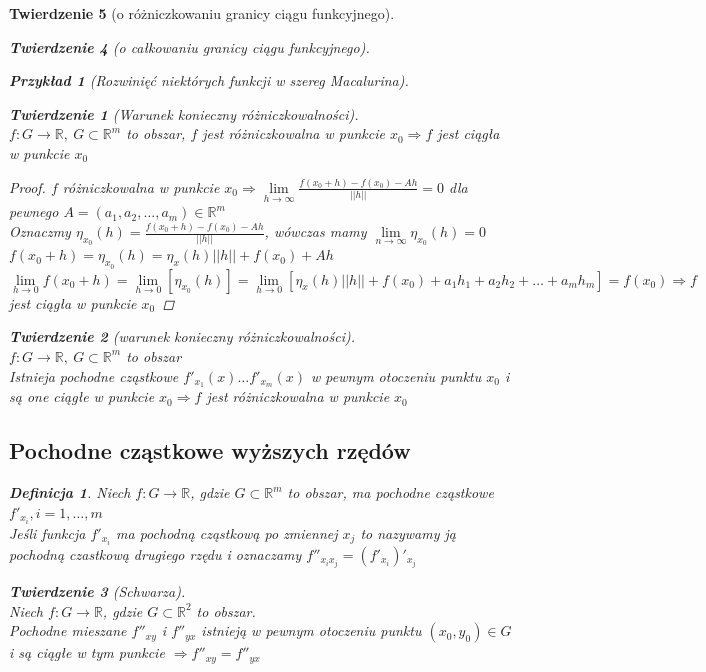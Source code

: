 \documentclass[12pt,a4paper]{article}
\newtheorem{tw}{Twierdzenie}
\newtheorem{przyklad}{Przykład}
\theoremstyle{definition}
\newtheorem{df}{Definicja}
\begin{document}
\begin{tw}[o różniczkowaniu granicy ciągu funkcyjnego]
\begin{tw}[o całkowaniu granicy ciągu funkcyjnego]
\begin{przyklad}[Rozwinięć niektórych funkcji w szereg Macalurina]

\begin{tw}[Warunek konieczny różniczkowalności]~\\
$f:G\to\mathbb{R}, ~ G\subset\mathbb{R}^m$ to obszar, $f$ jest różniczkowalna w punkcie $x_0 \Rightarrow f$ jest ciągła w punkcie $x_0$
\begin{proof}
$f$ różniczkowalna w punkcie $x_0 \Rightarrow \lim\limits_{h\to\infty}\frac{f(x_0+h)-f(x_0)-Ah}{||h||}=0$ dla pewnego $A=(a_1,a_2, \dots, a_m) \in \mathbb{R}^m$\\
Oznaczmy $\eta_{x_0}(h) = \frac{f(x_0+h)-f(x_0)-Ah}{||h||}$, wówczas mamy $\lim\limits_{n\to\infty}\eta_{x_0}(h) = 0$\\
$f(x_0+h)=\eta_{x_0}(h) = \eta_x(h)||h|| + f(x_0) + Ah$\\
$\lim\limits_{h\to 0}f(x_0+h) = \lim\limits_{h\to 0}[\eta_{x_0}(h)] = \lim\limits_{h\to 0}[\eta_x(h)||h|| + f(x_0) + a_1h_1 + a_2h_2 + \dots + a_mh_m] = f(x_0) \Rightarrow f$ jest ciągła w punkcie $x_0$
\end{proof}
\end{tw}

\begin{tw}[warunek konieczny różniczkowalności]~\\
$f: G\to\mathbb{R}, ~ G\subset \mathbb{R}^m$ to obszar\\
Istnieja pochodne cząstkowe $f'_{x_1}(x)\dots f'_{x_m}(x)$ w pewnym otoczeniu punktu $x_0$ i są one ciągłe w punkcie $x_0 \Rightarrow f$ jest różniczkowalna w punkcie $x_0$
\end{tw}

\subsection{Pochodne cząstkowe wyższych rzędów}
\begin{df}
Niech $f: G\to\mathbb{R}$, gdzie $G\subset \mathbb{R}^m$ to obszar, ma pochodne cząstkowe $f'_{x_i}, i=1,\dots , m$\\
Jeśli funkcja $f'_{x_i}$ ma pochodną cząstkową po zmiennej $x_j$ to nazywamy ją pochodną czastkową drugiego rzędu i oznaczamy $f''_{x_ix_j} = (f'_{x_i})'_{x_j}$
\end{df}

\begin{tw}[Schwarza]~\\
Niech $f: G\to\mathbb{R}$, gdzie $G\subset \mathbb{R}^2$ to obszar.\\
Pochodne mieszane $f''_{xy}$ i $f''_{yx}$ istnieją w pewnym otoczeniu punktu $(x_0, y_0)\in G$ i są ciągłe w tym punkcie $\Rightarrow f''_{xy} = f''_{yx}$
\end{tw}


\end{przyklad}
\end{tw}
\end{tw}
\end{document}
